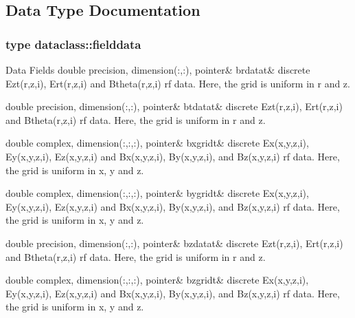 \subsection{Data Type Documentation}
\label{structdataclass_1_1fielddata}
\subsubsection{type dataclass\+::fielddata}
\begin{DoxyFields}{Data Fields}
\mbox{\label{namespacedataclass_af2e812c6f2b2202954a724f0c7f934ca}} 
double precision, dimension(:,:), pointer&
brdatat&
discrete Ezt(r,z,i), Ert(r,z,i) and Btheta(r,z,i) rf data. Here, the grid is uniform in r and z. \\
\hline

\mbox{\label{namespacedataclass_a36e12caa5512ea4a766181f407257c1e}} 
double precision, dimension(:,:), pointer&
btdatat&
discrete Ezt(r,z,i), Ert(r,z,i) and Btheta(r,z,i) rf data. Here, the grid is uniform in r and z. \\
\hline

\mbox{\label{namespacedataclass_a721338251ef870b206bd747d77330be2}} 
double complex, dimension(:,:,:), pointer&
bxgridt&
discrete Ex(x,y,z,i), Ey(x,y,z,i), Ez(x,y,z,i) and Bx(x,y,z,i), By(x,y,z,i), and Bz(x,y,z,i) rf data. Here, the grid is uniform in x, y and z. \\
\hline

\mbox{\label{namespacedataclass_a5be2ee97690040bc191e474a8128268c}} 
double complex, dimension(:,:,:), pointer&
bygridt&
discrete Ex(x,y,z,i), Ey(x,y,z,i), Ez(x,y,z,i) and Bx(x,y,z,i), By(x,y,z,i), and Bz(x,y,z,i) rf data. Here, the grid is uniform in x, y and z. \\
\hline

\mbox{\label{namespacedataclass_aeff2d035d7e3b4ee7bb7efea43b160fe}} 
double precision, dimension(:,:), pointer&
bzdatat&
discrete Ezt(r,z,i), Ert(r,z,i) and Btheta(r,z,i) rf data. Here, the grid is uniform in r and z. \\
\hline

\mbox{\label{namespacedataclass_a9624d17177a345e1bc8749b6bdb4c451}} 
double complex, dimension(:,:,:), pointer&
bzgridt&
discrete Ex(x,y,z,i), Ey(x,y,z,i), Ez(x,y,z,i) and Bx(x,y,z,i), By(x,y,z,i), and Bz(x,y,z,i) rf data. Here, the grid is uniform in x, y and z. \\
\hline


\end{DoxyFields}
